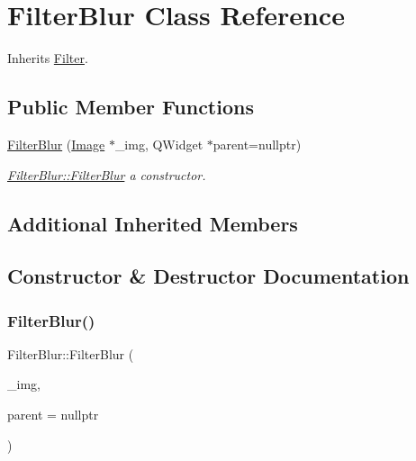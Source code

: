 \hypertarget{class_filter_blur}{}\section{Filter\+Blur Class Reference}
\label{class_filter_blur}


Inherits \mbox{\hyperlink{class_filter}{Filter}}.

\subsection*{Public Member Functions}
\begin{DoxyCompactItemize}
\item 
\mbox{\hyperlink{class_filter_blur_a060cd0551ff0d3056cbabb050dcf2640}{Filter\+Blur}} (\mbox{\hyperlink{class_image}{Image}} $\ast$\+\_\+img, Q\+Widget $\ast$parent=nullptr)
\begin{DoxyCompactList}\small\item\em \mbox{\hyperlink{class_filter_blur_a060cd0551ff0d3056cbabb050dcf2640}{Filter\+Blur\+::\+Filter\+Blur}} a constructor. \end{DoxyCompactList}\end{DoxyCompactItemize}
\subsection*{Additional Inherited Members}


\subsection{Constructor \& Destructor Documentation}
\mbox{\label{class_filter_blur_a060cd0551ff0d3056cbabb050dcf2640}} 
\subsubsection{\texorpdfstring{FilterBlur()}{FilterBlur()}}
{\footnotesize\ttfamily Filter\+Blur\+::\+Filter\+Blur (\begin{DoxyParamCaption}\item[{\mbox{\hyperlink{class_image}{Image}} $\ast$}]{\+\_\+img,  }\item[{Q\+Widget $\ast$}]{parent = {\ttfamily nullptr} }\end{DoxyParamCaption})}



